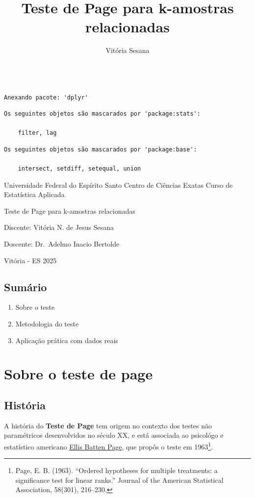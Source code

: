 \documentclass[
  letterpaper,
  DIV=11,
  numbers=noendperiod]{scrartcl}
\title{Teste de Page para k-amostras relacionadas}
\author{Vitória Sesana}
\date{}
\providecommand{\tightlist}{%
  \setlength{\itemsep}{0pt}\setlength{\parskip}{0pt}}\usepackage{longtable,booktabs,array}
\begin{document}
\maketitle


\begin{verbatim}

Anexando pacote: 'dplyr'
\end{verbatim}

\begin{verbatim}
Os seguintes objetos são mascarados por 'package:stats':

    filter, lag
\end{verbatim}

\begin{verbatim}
Os seguintes objetos são mascarados por 'package:base':

    intersect, setdiff, setequal, union
\end{verbatim}

Universidade Federal do Espírito Santo Centro de Ciências Exatas Curso
de Estatística Aplicada

Teste de Page para k-amostras relacionadas

Discente: Vitória N. de Jesus Sesana

Doscente: Dr.~Adelmo Inacio Bertolde

Vitória - ES 2025

\subsection{Sumário}\label{sumuxe1rio}

\begin{enumerate}
\def\labelenumi{\arabic{enumi}.}
\tightlist
\item
  Sobre o teste
\item
  Metodologia do teste
\item
  Aplicação prática com dados reais
\end{enumerate}

\section{Sobre o teste de page}\label{sobre-o-teste-de-page}

\subsection{História}\label{histuxf3ria}

A história do \textbf{Teste de Page} tem origem no contexto dos testes
não paramétricos desenvolvidos no século XX, e está associada ao
psicológo e estatístico americano \ul{Ellis Batten Page}, que propôs o
teste em 1963\footnote{Page, E. B. (1963). ``Ordered hypotheses for
  multiple treatments: a significance test for linear ranks.'' Journal
  of the American Statistical Association, 58(301), 216--230.}.
\end{document}
